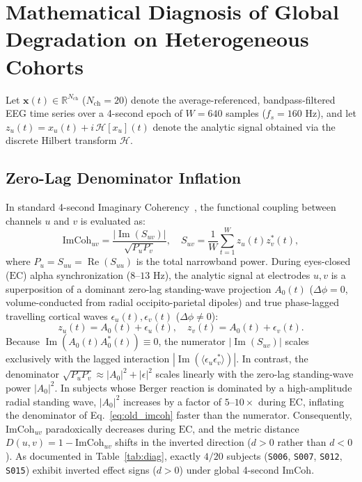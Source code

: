\documentclass[10pt,twocolumn]{article}
\begin{document}
\section{Mathematical Diagnosis of Global Degradation on Heterogeneous Cohorts}

Let $\mathbf{x}(t) \in \mathbb{R}^{N_{\mathrm{ch}}}$ ($N_{\mathrm{ch}}=20$) denote the average-referenced, bandpass-filtered EEG time series over a 4-second epoch of $W = 640$ samples ($f_s = 160\text{ Hz}$), and let $z_u(t) = x_u(t) + i\,\mathcal{H}[x_u](t)$ denote the analytic signal obtained via the discrete Hilbert transform $\mathcal{H}$.

\subsection{Zero-Lag Denominator Inflation}
In standard 4-second Imaginary Coherency~\cite{nolte2004}, the functional coupling between channels $u$ and $v$ is evaluated as:
\begin{equation}
    \mathrm{ImCoh}_{uv} = \frac{|\operatorname{Im}(S_{uv})|}{\sqrt{P_u P_v}}, \quad S_{uv} = \frac{1}{W}\sum_{t=1}^{W} z_u(t)z_v^*(t),
    \label{eq:old_imcoh}
\end{equation}
where $P_u = S_{uu} = \operatorname{Re}(S_{uu})$ is the total narrowband power. During eyes-closed ($\mathrm{EC}$) alpha synchronization ($8\text{--}13\text{ Hz}$), the analytic signal at electrodes $u,v$ is a superposition of a dominant zero-lag standing-wave projection $A_0(t)$ ($\Delta\phi = 0$, volume-conducted from radial occipito-parietal dipoles) and true phase-lagged travelling cortical waves $\epsilon_u(t), \epsilon_v(t)$ ($\Delta\phi \neq 0$):
\begin{equation}
    z_u(t) = A_0(t) + \epsilon_u(t), \quad z_v(t) = A_0(t) + \epsilon_v(t).
\end{equation}
Because $\operatorname{Im}(A_0(t)A_0^*(t)) \equiv 0$, the numerator $|\operatorname{Im}(S_{uv})|$ scales exclusively with the lagged interaction $|\operatorname{Im}(\langle \epsilon_u \epsilon_v^* \rangle)|$. In contrast, the denominator $\sqrt{P_u P_v} \approx |A_0|^2 + |\epsilon|^2$ scales linearly with the zero-lag standing-wave power $|A_0|^2$. In subjects whose Berger reaction is dominated by a high-amplitude radial standing wave, $|A_0|^2$ increases by a factor of $5\text{--}10\times$ during $\mathrm{EC}$, inflating the denominator of Eq.~\eqref{eq:old_imcoh} faster than the numerator. Consequently, $\mathrm{ImCoh}_{uv}$ paradoxically decreases during $\mathrm{EC}$, and the metric distance $D(u,v) = 1 - \mathrm{ImCoh}_{uv}$ shifts in the inverted direction ($d > 0$ rather than $d < 0$). As documented in Table~\ref{tab:diag}, exactly $4/20$ subjects (\texttt{S006}, \texttt{S007}, \texttt{S012}, \texttt{S015}) exhibit inverted effect signs ($d > 0$) under global 4-second $\mathrm{ImCoh}$.
\end{document}
